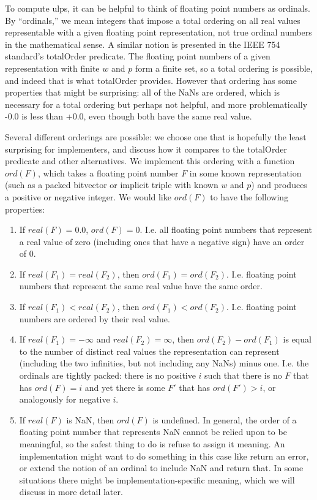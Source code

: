 \documentclass[letterpaper,10pt]{article}
\begin{document}
To compute ulps, it can be helpful to think of floating point numbers as ordinals. By ``ordinals,'' we mean integers that impose a total ordering on all real values representable with a given floating point representation, not true ordinal numbers in the mathematical sense. A similar notion is presented in the IEEE 754 standard's totalOrder predicate. The floating point numbers of a given representation with finite $w$ and $p$ form a finite set, so a total ordering is possible, and indeed that is what totalOrder provides. However that ordering has some properties that might be surprising: all of the NaNs are ordered, which is necessary for a total ordering but perhaps not helpful, and more problematically -0.0 is less than +0.0, even though both have the same real value.

Several different orderings are possible: we choose one that is hopefully the least surprising for implementers, and discuss how it compares to the totalOrder predicate and other alternatives. We implement this ordering with a function $ord(F)$, which takes a floating point number $F$ in some known representation (such as a packed bitvector or implicit triple with known $w$ and $p$) and produces a positive or negative integer. We would like $ord(F)$ to have the following properties:

\begin{enumerate}
 \item If $real(F) = 0.0$, $ord(F) = 0$. I.e. all floating point numbers that represent a real value of zero (including ones that have a negative sign) have an order of 0.
 \item If $real(F_1) = real(F_2)$, then $ord(F_1) = ord(F_2)$. I.e. floating point numbers that represent the same real value have the same order.
 \item If $real(F_1) < real(F_2)$, then $ord(F_1) < ord(F_2)$. I.e. floating point numbers are ordered by their real value.
 \item If $real(F_1) = -\infty$ and $real(F_2) = \infty$, then $ord(F_2) - ord(F_1)$ is equal to the number of distinct real values the representation can represent (including the two infinities, but not including any NaNs) minus one. I.e. the ordinals are tightly packed: there is no positive $i$ such that there is no $F$ that has $ord(F) = i$ and yet there is some $F'$ that has $ord(F') > i$, or analogously for negative $i$.
 \item If $real(F)$ is NaN, then $ord(F)$ is undefined. In general, the order of a floating point number that represents NaN cannot be relied upon to be meaningful, so the safest thing to do is refuse to assign it meaning. An implementation might want to do something in this case like return an error, or extend the notion of an ordinal to include NaN and return that. In some situations there might be implementation-specific meaning, which we will discuss in more detail later.
\end{enumerate}
\end{document}
